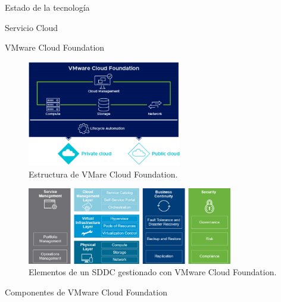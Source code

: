 \begin{chapter}{Estado de la tecnología}
\begin{section}{Servicio Cloud}
\begin{subsection}{VMware Cloud Foundation}
\begin{itemize}
    \end{itemize}
    \begin{figure}[h!]
        \centering
        \includegraphics[width=0.6\textwidth]{imaxes/cap2recursos/overviewCF.png}
                \caption{Estructura de VMare Cloud Foundation.}
        \label{fig:Cloud-Foundation-Overview}
        \end{figure}
        \FloatBarrier
        \begin{figure}[h]
            \centering
            \includegraphics[width=0.8\textwidth]{imaxes/cap2recursos/SDDCoverview.png}
            \caption{Elementos de un SDDC gestionado con VMware Cloud Foundation.}
            \label{fig:layers-Sddc}
        \end{figure}
        \FloatBarrier
    \end{subsection}
    
    \begin{subsection}{Componentes de VMware Cloud Foundation}
    \label{subsubsect:cfcomponents}
    

\end{subsection}
\end{section}
\end{chapter}
